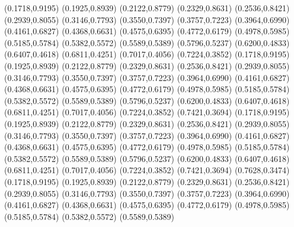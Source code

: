 \PST@Diamond(0.1718,0.9195)
\PST@Diamond(0.1925,0.8939)
\PST@Diamond(0.2122,0.8779)
\PST@Diamond(0.2329,0.8631)
\PST@Diamond(0.2536,0.8421)
\PST@Diamond(0.2939,0.8055)
\PST@Diamond(0.3146,0.7793)
\PST@Diamond(0.3550,0.7397)
\PST@Diamond(0.3757,0.7223)
\PST@Diamond(0.3964,0.6990)
\PST@Diamond(0.4161,0.6827)
\PST@Diamond(0.4368,0.6631)
\PST@Diamond(0.4575,0.6395)
\PST@Diamond(0.4772,0.6179)
\PST@Diamond(0.4978,0.5985)
\PST@Diamond(0.5185,0.5784)
\PST@Diamond(0.5382,0.5572)
\PST@Diamond(0.5589,0.5389)
\PST@Diamond(0.5796,0.5237)
\PST@Diamond(0.6200,0.4833)
\PST@Diamond(0.6407,0.4618)
\PST@Diamond(0.6811,0.4251)
\PST@Diamond(0.7017,0.4056)
\PST@Diamond(0.7224,0.3852)
\PST@Diamond(0.1718,0.9195)
\PST@Diamond(0.1925,0.8939)
\PST@Diamond(0.2122,0.8779)
\PST@Diamond(0.2329,0.8631)
\PST@Diamond(0.2536,0.8421)
\PST@Diamond(0.2939,0.8055)
\PST@Diamond(0.3146,0.7793)
\PST@Diamond(0.3550,0.7397)
\PST@Diamond(0.3757,0.7223)
\PST@Diamond(0.3964,0.6990)
\PST@Diamond(0.4161,0.6827)
\PST@Diamond(0.4368,0.6631)
\PST@Diamond(0.4575,0.6395)
\PST@Diamond(0.4772,0.6179)
\PST@Diamond(0.4978,0.5985)
\PST@Diamond(0.5185,0.5784)
\PST@Diamond(0.5382,0.5572)
\PST@Diamond(0.5589,0.5389)
\PST@Diamond(0.5796,0.5237)
\PST@Diamond(0.6200,0.4833)
\PST@Diamond(0.6407,0.4618)
\PST@Diamond(0.6811,0.4251)
\PST@Diamond(0.7017,0.4056)
\PST@Diamond(0.7224,0.3852)
\PST@Diamond(0.7421,0.3694)
\PST@Diamond(0.1718,0.9195)
\PST@Diamond(0.1925,0.8939)
\PST@Diamond(0.2122,0.8779)
\PST@Diamond(0.2329,0.8631)
\PST@Diamond(0.2536,0.8421)
\PST@Diamond(0.2939,0.8055)
\PST@Diamond(0.3146,0.7793)
\PST@Diamond(0.3550,0.7397)
\PST@Diamond(0.3757,0.7223)
\PST@Diamond(0.3964,0.6990)
\PST@Diamond(0.4161,0.6827)
\PST@Diamond(0.4368,0.6631)
\PST@Diamond(0.4575,0.6395)
\PST@Diamond(0.4772,0.6179)
\PST@Diamond(0.4978,0.5985)
\PST@Diamond(0.5185,0.5784)
\PST@Diamond(0.5382,0.5572)
\PST@Diamond(0.5589,0.5389)
\PST@Diamond(0.5796,0.5237)
\PST@Diamond(0.6200,0.4833)
\PST@Diamond(0.6407,0.4618)
\PST@Diamond(0.6811,0.4251)
\PST@Diamond(0.7017,0.4056)
\PST@Diamond(0.7224,0.3852)
\PST@Diamond(0.7421,0.3694)
\PST@Diamond(0.7628,0.3474)
\PST@Diamond(0.1718,0.9195)
\PST@Diamond(0.1925,0.8939)
\PST@Diamond(0.2122,0.8779)
\PST@Diamond(0.2329,0.8631)
\PST@Diamond(0.2536,0.8421)
\PST@Diamond(0.2939,0.8055)
\PST@Diamond(0.3146,0.7793)
\PST@Diamond(0.3550,0.7397)
\PST@Diamond(0.3757,0.7223)
\PST@Diamond(0.3964,0.6990)
\PST@Diamond(0.4161,0.6827)
\PST@Diamond(0.4368,0.6631)
\PST@Diamond(0.4575,0.6395)
\PST@Diamond(0.4772,0.6179)
\PST@Diamond(0.4978,0.5985)
\PST@Diamond(0.5185,0.5784)
\PST@Diamond(0.5382,0.5572)
\PST@Diamond(0.5589,0.5389)
